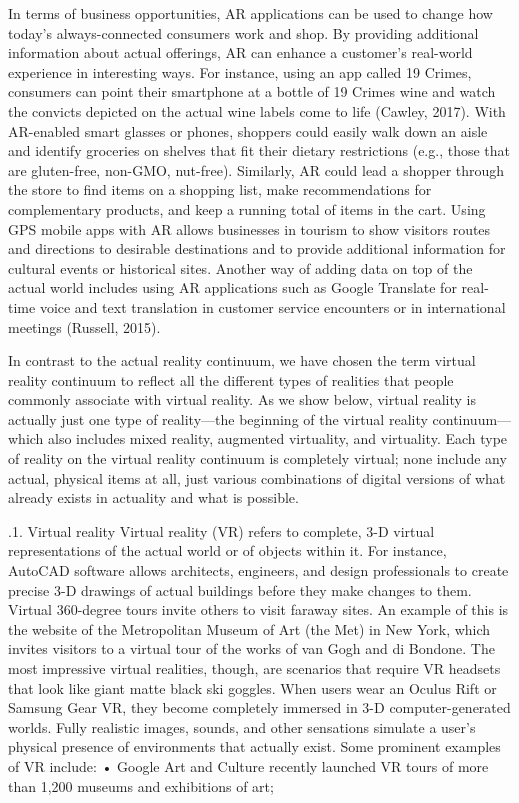 In terms of business opportunities, AR applications can be used to change how today’s always-connected consumers work and shop. By providing additional information about actual offerings, AR can enhance a customer’s real-world experience in interesting ways. For instance, using an app called 19 Crimes, consumers can point their smartphone at a bottle of 19 Crimes wine and watch the convicts depicted on the actual wine labels come to life (Cawley, 2017). With AR-enabled smart glasses or phones, shoppers could easily walk down an aisle and identify groceries on shelves that fit their dietary restrictions (e.g., those that are gluten-free, non-GMO, nut-free). Similarly, AR could lead a shopper through the store to find items on a shopping list, make recommendations for complementary products, and keep a running total of items in the cart. Using GPS mobile apps with AR allows businesses in tourism to show visitors routes and directions to desirable destinations and to provide additional information for cultural events or historical sites. Another way of adding data on top of the actual world includes using AR applications such as Google Translate for real-time voice and text translation in customer service encounters or in international meetings (Russell, 2015).



In contrast to the actual reality continuum, we have chosen the term virtual reality continuum to reflect all the different types of realities that people commonly associate with virtual reality. As we show below, virtual reality is actually just one type of reality—the beginning of the virtual reality continuum—which also includes mixed reality, augmented virtuality, and virtuality. Each type of reality on the virtual reality continuum is completely virtual; none include any actual, physical items at all, just various combinations of digital versions of what already exists in actuality and what is possible.


.1. Virtual reality
Virtual reality (VR) refers to complete, 3-D virtual representations of the actual world or of objects within it. For instance, AutoCAD software allows architects, engineers, and design professionals to create precise 3-D drawings of actual buildings before they make changes to them. Virtual 360-degree tours invite others to visit faraway sites. An example of this is the website of the Metropolitan Museum of Art (the Met) in New York, which invites visitors to a virtual tour of the works of van Gogh and di Bondone. The most impressive virtual realities, though, are scenarios that require VR headsets that look like giant matte black ski goggles. When users wear an Oculus Rift or Samsung Gear VR, they become completely immersed in 3-D computer-generated worlds. Fully realistic images, sounds, and other sensations simulate a user’s physical presence of environments that actually exist. Some prominent examples of VR include:
•
Google Art and Culture recently launched VR tours of more than 1,200 museums and exhibitions of art;

